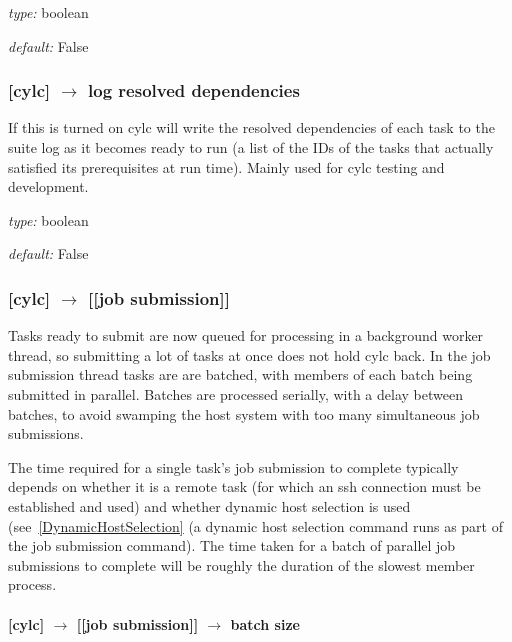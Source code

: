 \begin{myitemize}
    \item {\em type:} boolean
    \item {\em default:} False
\end{myitemize}

\subsubsection[log resolved dependencies]{[cylc] $\rightarrow$ log resolved dependencies}

If this is turned on cylc will write the resolved dependencies of each
task to the suite log as it becomes ready to run (a list of the IDs of
the tasks that actually satisfied its prerequisites at run time). Mainly
used for cylc testing and development.

\begin{myitemize}
    \item {\em type:} boolean
    \item {\em default:} False
\end{myitemize}

\subsubsection[{[[}job submission{]]}]{[cylc] $\rightarrow$ [[job submission]]}

Tasks ready to submit are now queued for processing in a background
worker thread, so submitting a lot of tasks at once does not hold cylc 
back.  In the job submission thread tasks are are batched, with members
of each batch being submitted in parallel. Batches are processed serially, 
with a delay between batches, to avoid swamping the host system with too
many simultaneous job submissions. 

The time required for a single task's job submission to complete
typically depends on whether it is a remote task (for which an ssh
connection must be established and used) and whether dynamic host
selection is used (see~\ref{DynamicHostSelection} (a dynamic host
selection command runs as part of the job submission command). The time
taken for a batch of parallel job submissions to complete will be
roughly the duration of the slowest member process. 

\paragraph[batch size]{[cylc] $\rightarrow$ [[job submission]] $\rightarrow$ batch size}

